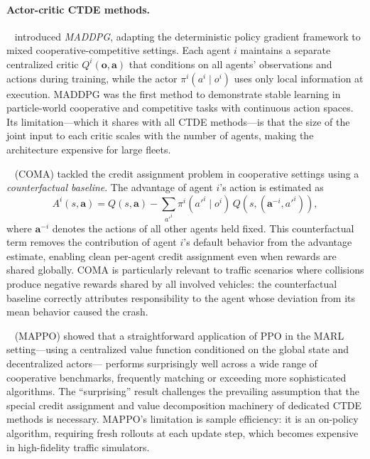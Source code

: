 \documentclass[12pt, a4paper]{article}
\begin{document}
\paragraph{Actor-critic CTDE methods.}
\citeauthor{lowe2017multi}~\cite{lowe2017multi} introduced \emph{MADDPG},
adapting the deterministic policy gradient framework to mixed cooperative-competitive
settings.  Each agent $i$ maintains a separate centralized critic
$Q^i(\mathbf{o}, \mathbf{a})$ that conditions on all agents' observations and
actions during training, while the actor $\pi^i(a^i \mid o^i)$ uses only local
information at execution.  MADDPG was the first method to demonstrate stable
learning in particle-world cooperative and competitive tasks with continuous
action spaces.  Its limitation---which it shares with all CTDE methods---is
that the size of the joint input to each critic scales with the number of agents,
making the architecture expensive for large fleets.

\citeauthor{foerster2018counterfactual}~\cite{foerster2018counterfactual}
(COMA) tackled the credit assignment problem in cooperative settings using a
\emph{counterfactual baseline}.  The advantage of agent $i$'s action is
estimated as
\[
  A^i(s, \mathbf{a}) = Q(s, \mathbf{a}) - \sum_{a'^i} \pi^i(a'^i \mid o^i)\, Q(s, (\mathbf{a}^{-i}, a'^i)),
\]
where $\mathbf{a}^{-i}$ denotes the actions of all other agents held fixed.
This counterfactual term removes the contribution of agent $i$'s default
behavior from the advantage estimate, enabling clean per-agent credit
assignment even when rewards are shared globally.  COMA is particularly
relevant to traffic scenarios where collisions produce negative rewards shared
by all involved vehicles: the counterfactual baseline correctly attributes
responsibility to the agent whose deviation from its mean behavior caused the
crash.

\citeauthor{yu2021surprising}~\cite{yu2021surprising} (MAPPO) showed that a
straightforward application of PPO in the MARL setting---using a centralized
value function conditioned on the global state and decentralized actors---
performs surprisingly well across a wide range of cooperative benchmarks,
frequently matching or exceeding more sophisticated algorithms.  The ``surprising''
result challenges the prevailing assumption that the special credit assignment
and value decomposition machinery of dedicated CTDE methods is necessary.
MAPPO's limitation is sample efficiency: it is an on-policy algorithm, requiring
fresh rollouts at each update step, which becomes expensive in high-fidelity
traffic simulators.
\end{document}
